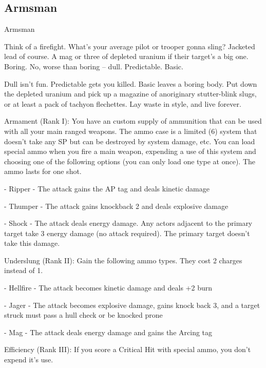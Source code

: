 \subsection{Armsman}


                                                  Armsman  

 Think of a firefight. What’s your average pilot or trooper gonna sling? Jacketed lead of course. A mag or  
three of depleted uranium if their target’s a big one. Boring. No, worse than boring -- dull. Predictable.  
Basic.   

Dull isn’t fun. Predictable gets you killed. Basic leaves a boring body. Put down the depleted uranium and  
pick up a magazine of anoriginary stutter-blink slugs, or at least a pack of tachyon flechettes. Lay waste in  
style, and live forever.  

Armament (Rank I): You have an custom supply of ammunition that can be used with all your  
main ranged weapons. The ammo case is a limited (6) system that doesn’t take any SP but can  
be destroyed by system damage, etc. You can load special ammo when you fire a main weapon,  
expending a use of this system and choosing one of the following options (you can only load one  
type at once). The ammo lasts for one shot.
 
         	- Ripper - The attack gains the AP tag and deals kinetic damage
 
         	- Thumper - The attack gains knockback 2 and deals explosive damage
 
         	- Shock - The attack deals energy damage. Any actors adjacent to the primary target  
         take 3 energy damage (no attack required). The primary target doesn’t take this damage.
 
Underslung (Rank II): Gain the following ammo types. They cost 2 charges instead of 1.
 
         	- Hellfire - The attack becomes kinetic damage and deals +2 burn
 
         - Jager - The attack becomes explosive damage, gains knock back 3, and a target struck  
         must pass a hull check or be knocked prone
 
         	- Mag - The attack deals energy damage and gains the Arcing tag
 
Efficiency (Rank III): If you score a Critical Hit with special ammo, you don’t expend it’s use.
 